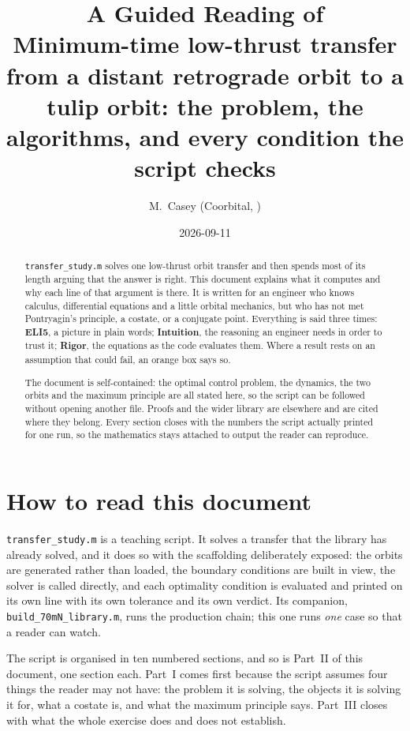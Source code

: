 \documentclass[11pt]{article}
\title{A Guided Reading of \file{transfer\_study.m}\\[2mm]
\large Minimum-time low-thrust transfer from a distant retrograde orbit to a
tulip orbit: the problem, the algorithms, and every condition the script checks}
\author{M.~Casey \quad (Coorbital, \file{orbit\_transfer/DRO\_tulip/})}
\date{2026-09-11}
\newcommand{\file}[1]{\texttt{#1}}
\begin{document}
\maketitle

\begin{abstract}
\file{transfer\_study.m} solves one low-thrust orbit transfer and then spends
most of its length arguing that the answer is right. This document explains
what it computes and why each line of that argument is there. It is written
for an engineer who knows calculus, differential equations and a little
orbital mechanics, but who has not met Pontryagin's principle, a costate, or
a conjugate point. Everything is said three times: \textbf{ELI5}, a picture in
plain words; \textbf{Intuition}, the reasoning an engineer needs in order to
trust it; \textbf{Rigor}, the equations as the code evaluates them. Where a
result rests on an assumption that could fail, an orange box says so.

The document is self-contained: the optimal control problem, the dynamics, the
two orbits and the maximum principle are all stated here, so the script can be
followed without opening another file. Proofs and the wider library are
elsewhere and are cited where they belong. Every section closes with the
numbers the script actually printed for one run, so the mathematics stays
attached to output the reader can reproduce.
\end{abstract}

\tableofcontents

\section{How to read this document}

\file{transfer\_study.m} is a teaching script. It solves a transfer that the
library has already solved, and it does so with the scaffolding deliberately
exposed: the orbits are generated rather than loaded, the boundary conditions
are built in view, the solver is called directly, and each optimality
condition is evaluated and printed on its own line with its own tolerance and
its own verdict. Its companion, \file{build\_70mN\_library.m}, runs the
production chain; this one runs \emph{one} case so that a reader can watch.

The script is organised in ten numbered sections, and so is Part~II of this
document, one section each. Part~I comes first because the script assumes four
things the reader may not have: the problem it is solving, the objects it is
solving it for, what a costate is, and what the maximum principle says. Part~III
closes with what the whole exercise does and does not establish.
\end{document}
